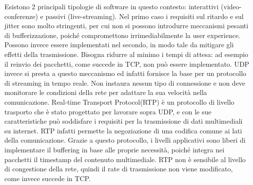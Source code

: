 Esistono 2 principali tipologie di software in questo contesto: interattivi (video-conferenze) e passivi (live-streaming). Nel primo caso i requisiti sul ritardo
e sul jitter sono molto stringenti, per cui non si possono introdurre meccanismi pesanti di bufferizzazione, poiché compromettono irrimediabilmente la user experience. Possono invece essere implementati nel secondo, in modo tale da mitigare gli effetti della trasmissione. Bisogna ridurre al minimo i tempi di attesa: ad esempio il reinvio dei pacchetti, come succede in TCP, non può essere implementato. UDP invece si presta a questo meccanismo ed infatti fornisce la base per un protocollo di streaming in tempo reale. Non instaura nessun tipo di connessione e non deve monitorare le condizioni della rete per adattare la sua velocità nella comunicazione. Real-time Transport Protocol(RTP) è un protocollo di livello trasporto\cite{b10rfc3550} %
che è stato progettato per lavorare sopra UDP, e con le sue caratteristiche può soddisfare i requisiti per la trasmissione di dati multimediali su internet. RTP infatti permette la negoziazione di una codifica comune ai lati della comunicazione. Grazie a questo protocollo, i livelli applicativi sono liberi di implementare il buffering in base alle proprie necessità, poiché integra nei pacchetti il timestamp del contenuto multimediale. RTP non è sensibile al livello di congestione della rete, quindi il rate di trasmissione non viene modificato, come invece succede in TCP. %

